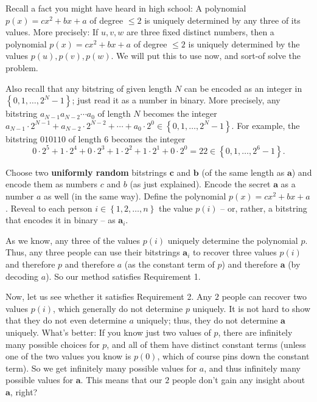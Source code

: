 \documentclass[numbers=enddot,12pt,final,onecolumn,notitlepage]{scrartcl}%
\numberwithin{exer}{subsection}
\theoremstyle{definition}
\begin{document}
Recall a fact you might have heard in high school: A polynomial $p\left(
x\right)  =cx^{2}+bx+a$ of degree $\leq2$ is uniquely determined by any three
of its values. More precisely: If $u,v,w$ are three fixed distinct numbers,
then a polynomial $p\left(  x\right)  =cx^{2}+bx+a$ of degree $\leq2$ is
uniquely determined by the values $p\left(  u\right)  ,p\left(  v\right)
,p\left(  w\right)  $. We will put this to use now, and sort-of solve the problem.

Also recall that any bitstring of given length $N$ can be encoded as an
integer in $\left\{  0,1,\ldots,2^{N}-1\right\}  $; just read it as a number
in binary. More precisely, any bitstring $a_{N-1}a_{N-2}\cdots a_{0}$ of
length $N$ becomes the integer $a_{N-1}\cdot2^{N-1}+a_{N-2}\cdot2^{N-2}%
+\cdots+a_{0}\cdot2^{0}\in\left\{  0,1,\ldots,2^{N}-1\right\}  $. For example,
the bitstring $010110$ of length $6$ becomes the integer%
\[
0\cdot2^{5}+1\cdot2^{4}+0\cdot2^{3}+1\cdot2^{2}+1\cdot2^{1}+0\cdot2^{0}%
=22\in\left\{  0,1,\ldots,2^{6}-1\right\}  .
\]


Choose two \textbf{uniformly random} bitstrings $\mathbf{c}$ and $\mathbf{b}$
(of the same length as $\mathbf{a}$) and encode them as numbers $c$ and $b$
(as just explained). Encode the secret $\mathbf{a}$ as a number $a$ as well
(in the same way). Define the polynomial $p\left(  x\right)  =cx^{2}+bx+a$.
Reveal to each person $i\in\left\{  1,2,\ldots,n\right\}  $ the value
$p\left(  i\right)  $ -- or, rather, a bitstring that encodes it in binary --
as $\mathbf{a}_{i}$.

As we know, any three of the values $p\left(  i\right)  $ uniquely determine
the polynomial $p$. Thus, any three people can use their bitstrings
$\mathbf{a}_{i}$ to recover three values $p\left(  i\right)  $ and therefore
$p$ and therefore $a$ (as the constant term of $p$) and therefore $\mathbf{a}$
(by decoding $a$). So our method satisfies Requirement 1.

Now, let us see whether it satisfies Requirement 2. Any $2$ people can recover
two values $p\left(  i\right)  $, which generally do not determine $p$
uniquely. It is not hard to show that they do not even determine $a$ uniquely;
thus, they do not determine $\mathbf{a}$ uniquely. What's better: If you know
just two values of $p$, there are infinitely many possible choices for $p$,
and all of them have distinct constant terms (unless one of the two values you
know is $p\left(  0\right)  $, which of course pins down the constant term).
So we get infinitely many possible values for $a$, and thus infinitely many
possible values for $\mathbf{a}$. This means that our $2$ people don't gain
any insight about $\mathbf{a}$, right?
\end{document}
